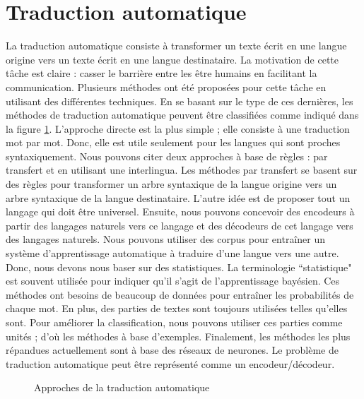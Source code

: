 \documentclass{KodeBook}
\begin{document}
\section{Traduction automatique}

La traduction automatique consiste à transformer un texte écrit en une langue origine vers un texte écrit en une langue destinataire.
La motivation de cette tâche est claire : casser le barrière entre les être humains en facilitant la communication. 
Plusieurs méthodes ont été proposées pour cette tâche en utilisant des différentes techniques. 
En se basant sur le type de ces dernières, les méthodes de traduction automatique peuvent être classifiées comme indiqué dans la figure \ref{fig:mt-class}. 
L'approche directe est la plus simple ; elle consiste à une traduction mot par mot. 
Donc, elle est utile seulement pour les langues qui sont proches syntaxiquement.
Nous pouvons citer deux approches à base de règles : par transfert et en utilisant une interlingua.
Les méthodes par transfert se basent sur des règles pour transformer un arbre syntaxique de la langue origine vers un arbre syntaxique de la langue destinataire. 
L'autre idée est de proposer tout un langage qui doit être universel.
Ensuite, nous pouvons concevoir des encodeurs à partir des langages naturels vers ce langage et des décodeurs de cet langage vers des langages naturels.
Nous pouvons utiliser des corpus pour entraîner un système d'apprentissage automatique à traduire d'une langue vers une autre. 
Donc, nous devons nous baser sur des statistiques. 
La terminologie ``statistique" est souvent utilisée pour indiquer qu'il s'agit de l'apprentissage bayésien. 
Ces méthodes ont besoins de beaucoup de données pour entraîner les probabilités de chaque mot. 
En plus, des parties de textes sont toujours utilisées telles qu'elles sont. 
Pour améliorer la classification, nous pouvons utiliser ces parties comme unités ; d'où les méthodes à base d'exemples.
Finalement, les méthodes les plus répandues actuellement sont à base des réseaux de neurones. 
Le problème de traduction automatique peut être représenté comme un encodeur/décodeur.

\begin{figure}[ht]
	\centering
	\caption{Approches de la traduction automatique}
	\label{fig:mt-class}
\end{figure}
\end{document}
